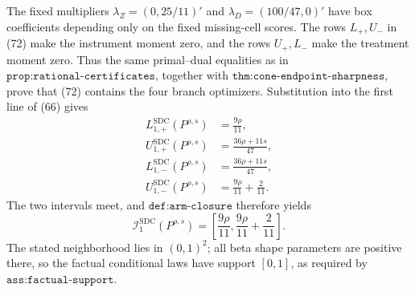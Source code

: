 The fixed multipliers \(\lambda_Z=(0,25/11)'\) and \(\lambda_D=(100/47,0)'\) have box coefficients depending only on the fixed missing-cell scores.  The rows \(L_+,U_-\) in (72) make the instrument moment zero, and the rows \(U_+,L_-\) make the treatment moment zero.  Thus the same primal--dual equalities as in \(\texttt{prop:rational-certificates}\), together with \(\texttt{thm:cone-endpoint-sharpness}\), prove that (72) contains the four branch optimizers.  Substitution into the first line of (66) gives
\[
 \begin{aligned}
 L_{1,+}^{\mathrm{SDC}}(P^{\rho,s})&=\frac{9\rho}{11},\\
 U_{1,+}^{\mathrm{SDC}}(P^{\rho,s})&=\frac{36\rho+11s}{47},\\
 L_{1,-}^{\mathrm{SDC}}(P^{\rho,s})&=\frac{36\rho+11s}{47},\\
 U_{1,-}^{\mathrm{SDC}}(P^{\rho,s})&=\frac{9\rho}{11}+\frac2{11}.
 \end{aligned}                                                               \tag{77}
\]
The two intervals meet, and \(\texttt{def:arm-closure}\) therefore yields
\[
 \mathcal I_1^{\mathrm{SDC}}(P^{\rho,s})
 =\left[\frac{9\rho}{11},\frac{9\rho}{11}+\frac2{11}\right].              \tag{78}
\]
The stated neighborhood lies in \((0,1)^2\); all beta shape parameters are positive there, so the factual conditional laws have support \([0,1]\), as required by \(\texttt{ass:factual-support}\).

